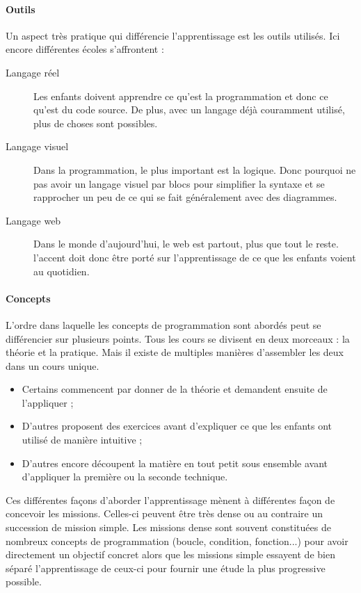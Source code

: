 \paragraph{Outils} 
Un aspect très pratique qui différencie l'apprentissage est les outils utilisés. Ici encore différentes écoles s'affrontent :
\begin{description}
  \item[Langage réel] Les enfants doivent apprendre ce qu'est la programmation et donc ce qu'est du code source. De plus, avec un langage déjà couramment utilisé, plus de choses sont possibles.
  \item[Langage visuel] Dans la programmation, le plus important est la logique. Donc pourquoi ne pas avoir un langage visuel par blocs pour simplifier la syntaxe et se rapprocher un peu de ce qui se fait généralement avec des diagrammes.
  \item[Langage web] Dans le monde d'aujourd'hui, le web est partout, plus que tout le reste. l'accent doit donc être porté sur l'apprentissage de ce que les enfants voient au quotidien.
\end{description}

\paragraph{Concepts} 
L'ordre dans laquelle les concepts de programmation sont abordés peut se différencier sur plusieurs points. Tous les cours se divisent en deux morceaux : la théorie et la pratique. Mais il existe de multiples manières d'assembler les deux dans un cours unique.
\begin{itemize}
  \item Certains commencent par donner de la théorie et demandent ensuite de l'appliquer ;
  \item D'autres proposent des exercices avant d'expliquer ce que les enfants ont utilisé de manière intuitive ;
  \item D'autres encore découpent la matière en tout petit sous ensemble avant d'appliquer la première ou la seconde technique.\\
  \end{itemize}


Ces différentes façons d'aborder l'apprentissage mènent à différentes façon de concevoir les missions. Celles-ci peuvent être très dense ou au contraire un succession de mission simple. Les missions dense sont souvent constituées de nombreux concepts de programmation (boucle, condition, fonction...) pour avoir directement un objectif concret alors que les missions simple essayent de bien séparé l'apprentissage de ceux-ci pour fournir une étude la plus progressive possible.\\

